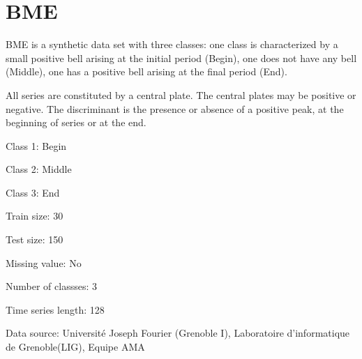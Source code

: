 \chapter{BME}
\hypertarget{md_external_2data_2UCRArchive__2018_2BME_2README}{}\label{md_external_2data_2UCRArchive__2018_2BME_2README}
\label{md_external_2data_2UCRArchive__2018_2BME_2README_autotoc_md24}%
%
 BME is a synthetic data set with three classes\+: one class is characterized by a small positive bell arising at the initial period (Begin), one does not have any bell (Middle), one has a positive bell arising at the final period (End).

All series are constituted by a central plate. The central plates may be positive or negative. The discriminant is the presence or absence of a positive peak, at the beginning of series or at the end.


\begin{DoxyItemize}
\item Class 1\+: Begin
\item Class 2\+: Middle
\item Class 3\+: End
\end{DoxyItemize}

Train size\+: 30

Test size\+: 150

Missing value\+: No

Number of classses\+: 3

Time series length\+: 128

Data source\+: Université Joseph Fourier (Grenoble I), Laboratoire d’informatique de Grenoble(\+LIG), Equipe AMA 